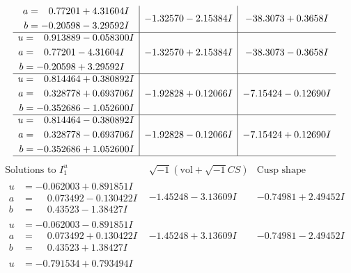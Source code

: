\documentclass[1p]{elsarticle_modified}
\theoremstyle{definition}
\newcommand{\I}{\sqrt{-1}}
\begin{document}
$$\begin{array}{c|c|c}
\begin{aligned}
a &= \phantom{-}0.77201 + 4.31604 I \\
b &= -0.20598 - 3.29592 I\end{aligned}
 & -1.32570 - 2.15384 I & -38.3073 + 0.3658 I \\ \hline\begin{aligned}
u &= \phantom{-}0.913889 - 0.058300 I \\
a &= \phantom{-}0.77201 - 4.31604 I \\
b &= -0.20598 + 3.29592 I\end{aligned}
 & -1.32570 + 2.15384 I & -38.3073 - 0.3658 I \\ \hline\begin{aligned}
u &= \phantom{-}0.814464 + 0.380892 I \\
a &= \phantom{-}0.328778 + 0.693706 I \\
b &= -0.352686 - 1.052600 I\end{aligned}
 & -1.92828 + 0.12066 I & -7.15424 - 0.12690 I \\ \hline\begin{aligned}
u &= \phantom{-}0.814464 - 0.380892 I \\
a &= \phantom{-}0.328778 - 0.693706 I \\
b &= -0.352686 + 1.052600 I\end{aligned}
 & -1.92828 - 0.12066 I & -7.15424 + 0.12690 I\\
 \hline 
 \end{array}$$\newpage$$\begin{array}{c|c|c}  
\text{Solutions to }I^u_{1}& \I (\text{vol} + \sqrt{-1}CS) & \text{Cusp shape}\\
 \hline 
\begin{aligned}
u &= -0.062003 + 0.891851 I \\
a &= \phantom{-}0.073492 - 0.130422 I \\
b &= \phantom{-}0.43523 - 1.38427 I\end{aligned}
 & -1.45248 - 3.13609 I & -0.74981 + 2.49452 I \\ \hline\begin{aligned}
u &= -0.062003 - 0.891851 I \\
a &= \phantom{-}0.073492 + 0.130422 I \\
b &= \phantom{-}0.43523 + 1.38427 I\end{aligned}
 & -1.45248 + 3.13609 I & -0.74981 - 2.49452 I \\ \hline\begin{aligned}
u &= -0.791534 + 0.793494 I \\

\end{aligned}
\end{array}$$
\end{document}
